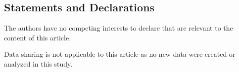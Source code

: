 \documentclass[11pt]{amsart}
\numberwithin{equation}{section}
\begin{document}
\subsection*{Statements and Declarations} 

\vspace{.2 cm}

  The authors have no competing interests to declare that are relevant to the content of this article.  

\vspace{.2 cm}

 Data sharing is not applicable to this article as no new data were created or analyzed in this study.



%

\end{document}
